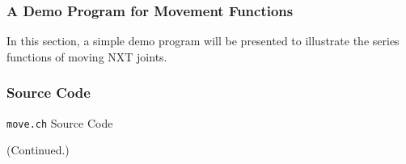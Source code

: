 \documentclass[11pt]{article}
\begin{document}
\subsubsection{A Demo Program for Movement Functions}
In this section, a simple demo program will be presented to illustrate the series functions of moving NXT joints.

\subsubsection*{Source Code}

\begin{Program}[H]
    {\small}
    \caption{\texttt{move.ch} Source Code\label{prog_move.ch}}
\end{Program}
\addtocounter{Program}{-1}
\begin{Program}[H]
    {\small}
    \caption{(Continued.)\label{prog_move.ch}}
\end{Program}
\end{document}
